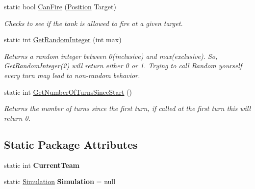 \begin{DoxyCompactItemize}
\mbox{\label{class_n_g_a_p_i_1_1_a_p_i_a7303ec11776de1bdc2a3138a4d001bb5}} 
static bool \hyperlink{class_n_g_a_p_i_1_1_a_p_i_a7303ec11776de1bdc2a3138a4d001bb5}{Can\+Fire} (\hyperlink{struct_n_g_a_p_i_1_1_position}{Position} Target)
\begin{DoxyCompactList}\small\item\em Checks to see if the tank is allowed to fire at a given target. \end{DoxyCompactList}\item 
static int \hyperlink{class_n_g_a_p_i_1_1_a_p_i_a63cedf132a30d25da3b4aa8e7a0d16db}{Get\+Random\+Integer} (int max)
\begin{DoxyCompactList}\small\item\em Returns a random integer between 0(inclusive) and max(exclusive). So, Get\+Random\+Integer(2) will return either 0 or 1. Trying to call Random yourself every turn may lead to non-\/random behavior. \end{DoxyCompactList}\item 
static int \hyperlink{class_n_g_a_p_i_1_1_a_p_i_a541c8a9511350ce4983690e6492a6221}{Get\+Number\+Of\+Turns\+Since\+Start} ()
\begin{DoxyCompactList}\small\item\em Returns the number of turns since the first turn, if called at the first turn this will return 0. \end{DoxyCompactList}\end{DoxyCompactItemize}
\subsection*{Static Package Attributes}
\begin{DoxyCompactItemize}
\item 
\mbox{\label{class_n_g_a_p_i_1_1_a_p_i_a16dd1313ce5607ace2f090b6e5cc046a}} 
static int {\bfseries Current\+Team}
\item 
\mbox{\label{class_n_g_a_p_i_1_1_a_p_i_affe3bb76635624559ed0b534bd52ec14}} 
static \hyperlink{class_n_g_a_p_i_1_1_simulation}{Simulation} {\bfseries Simulation} = null
\end{DoxyCompactItemize}
